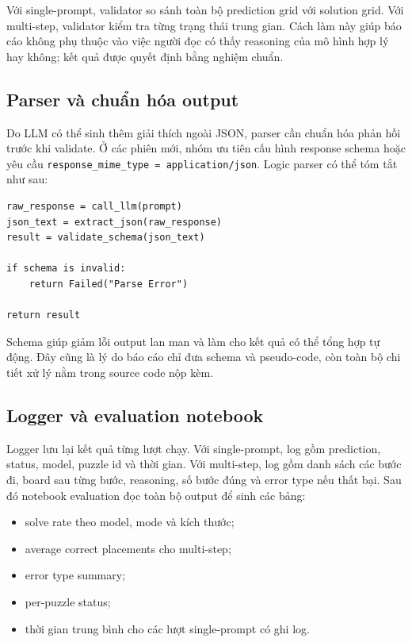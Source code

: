 \documentclass[12pt,a4paper,oneside]{report}
\newlength{\manualparindent}
\newcommand{\manualindent}{\hspace*{\manualparindent}}
\begin{document}
\manualindent%
Với single-prompt, validator so sánh toàn bộ prediction grid với solution grid. Với multi-step, validator kiểm tra từng trạng thái trung gian. Cách làm này giúp báo cáo không phụ thuộc vào việc người đọc có thấy reasoning của mô hình hợp lý hay không; kết quả được quyết định bằng nghiệm chuẩn.

\clearpage
\subsection{Parser và chuẩn hóa output}

\manualindent%
Do LLM có thể sinh thêm giải thích ngoài JSON, parser cần chuẩn hóa phản hồi trước khi validate. Ở các phiên mới, nhóm ưu tiên cấu hình response schema hoặc yêu cầu \texttt{response\_mime\_type = application/json}. Logic parser có thể tóm tắt như sau:

\begin{lstlisting}[style=promptstyle]
raw_response = call_llm(prompt)
json_text = extract_json(raw_response)
result = validate_schema(json_text)

if schema is invalid:
    return Failed("Parse Error")

return result
\end{lstlisting}

\manualindent%
Schema giúp giảm lỗi output lan man và làm cho kết quả có thể tổng hợp tự động. Đây cũng là lý do báo cáo chỉ đưa schema và pseudo-code, còn toàn bộ chi tiết xử lý nằm trong source code nộp kèm.

\subsection{Logger và evaluation notebook}

\manualindent%
Logger lưu lại kết quả từng lượt chạy. Với single-prompt, log gồm prediction, status, model, puzzle id và thời gian. Với multi-step, log gồm danh sách các bước đi, board sau từng bước, reasoning, số bước đúng và error type nếu thất bại. Sau đó notebook evaluation đọc toàn bộ output để sinh các bảng:

\begin{itemize}
  \item solve rate theo model, mode và kích thước;
  \item average correct placements cho multi-step;
  \item error type summary;
  \item per-puzzle status;
  \item thời gian trung bình cho các lượt single-prompt có ghi log.
\end{itemize}
\end{document}
